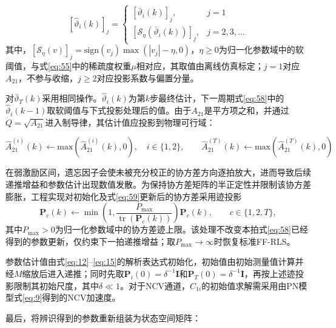 \begin{equation}
\label{eq:60}
{\left[ {{{\hat \vartheta }_i}(k)} \right]_j} = \left\{ {\begin{array}{*{20}{l}}
  {{{\left[ {{{\bar \vartheta }_i}(k)} \right]}_j},}&{j = 1}\\
  {{{\left[ {{\mathcal{S}_\eta }\left( {{{\bar \vartheta }_i}(k)} \right)} \right]}_j},}&{j = 2,3, \ldots }
\end{array}} \right.
\end{equation}
其中，${[{\mathcal{S}_\eta }(v)]_j} = {\text{sign}}({v_j})\max (|{v_j}| - \eta ,0)$，$\eta  \geqslant 0$为归一化参数域中的软阈值，与式\eqref{eq:55}中的稀疏度权重$\mu $相对应，其取值由离线仿真标定；$j = 1$对应${A_{21}}$，不参与收缩，$j \geqslant 2$对应投影系数与偏置分量。

对$\bar{\vartheta}_{T}(k)$采用相同操作。$\hat{\vartheta}_{i}(k)$为第$k$步最终估计，下一周期式\eqref{eq:58}中的$\hat{\vartheta}_{i}(k - 1)$取软阈值与下式投影处理后的值。由于${A_{21}}$是平方项之和，并通过$\dot Q = \sqrt {{A_{21}}} $进入制导律，其估计值应投影到物理可行域：

\begin{equation}
\label{eq:61}
\hat A_{21}^{(i)}(k) \leftarrow {\text{max}}(\hat A_{21}^{(i)}(k),0),\quad i \in \{1,2\},\qquad
\hat A_{21}^{(T)}(k) \leftarrow {\text{max}}(\hat A_{21}^{(T)}(k),0)
\end{equation}
\begin{remark}
在弱激励区间，遗忘因子会使未被充分校正的协方差方向逐拍放大，进而导致后续递推增益和参数估计出现数值发散。为保持协方差矩阵的半正定性并限制该协方差膨胀，工程实现对初始化及式\eqref{eq:59}更新后的协方差采用迹投影
\[
{\mathbf{P}}_c(k)\leftarrow
\min\left(1,\frac{P_{\max}}{\operatorname{tr}({\mathbf{P}}_c(k))}\right)
{\mathbf{P}}_c(k),\qquad c\in\{1,2,T\},
\]
其中$P_{\max}>0$为归一化参数域中的协方差迹上限。该处理不改变本拍式\eqref{eq:58}已经得到的参数更新，仅约束下一拍递推增益；取$P_{\max}\to\infty$时恢复标准FF-RLS。
\end{remark}
参数估计值由式\eqref{eq:12}--\eqref{eq:15}的解析表达式初始化，初始值由初始测量值计算并经$M$缩放后进入递推；同时先取${{\mathbf{P}}_i}(0) = {\delta ^{ - 1}}{\mathbf{I}}$和${{\mathbf{P}}_T}(0) = {\delta ^{ - 1}}{\mathbf{I}}$，再按上述迹投影限制其初始尺度，其中$\delta  \ll 1$。对于NCV通道，${C_{1i}}$的初始值求解需采用由PN模型式\eqref{eq:9}得到的NCV加速度。

最后，将辨识得到的参数重新组装为状态空间矩阵：

